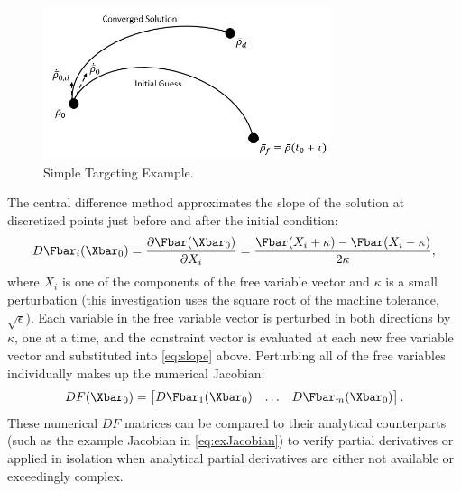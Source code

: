 \begin{figure}[H]
    \centering
    \includegraphics[width=0.75\textwidth]{figures/Targeting.jpg}
    \caption{Simple Targeting Example.}
    \label{fig:targeting}
\end{figure}

The central difference method approximates the slope of the solution at discretized points just
before and after the initial condition:
\begin{equation}
    D\Fbar_{i}(\Xbar_{0})=\frac{\partial\Fbar(\Xbar_{0})}{\partial X_{i}}=\frac{\Fbar(X_{i}+\kappa)-\Fbar(X_{i}-\kappa)}{2\kappa},
    \label{eq:slope}
\end{equation}
where $X_{i}$ is one of the components of the free variable vector and $\kappa$ is a small
perturbation (this investigation uses the square root of the machine tolerance, $\sqrt{\epsilon}$).
Each variable in the free variable vector is perturbed in both directions by $\kappa$, one at a
time, and the constraint vector is evaluated at each new free variable vector and substituted into
\cref{eq:slope} above. Perturbing all of the free variables individually makes up the numerical
Jacobian:
\begin{equation}
    DF(\Xbar_{0})=\begin{bmatrix}   D\Fbar_{1}(\Xbar_{0})   &   \dots   &   D\Fbar_{m}(\Xbar_{0})\end{bmatrix}.
    \label{eq:centraldifference}
\end{equation}
These numerical $DF$ matrices can be compared to their analytical counterparts (such as the example
Jacobian in \cref{eq:exJacobian}) to verify partial derivatives or applied in isolation when
analytical partial derivatives are either not available or exceedingly complex.
